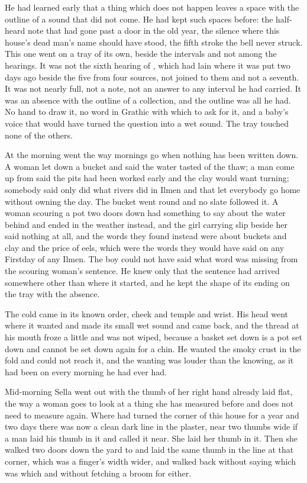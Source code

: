 He had learned early that a thing which does not happen leaves a space with the outline of a sound that did not come. He had kept such spaces before: the half-heard note that had gone past a door in the old year, the silence where this house's dead man's name should have stood, the fifth stroke the bell never struck. This one went on a tray of its own, beside the intervals and not among the hearings. It was not the sixth hearing of , which had lain where it was put two days ago beside the five from four sources, not joined to them and not a seventh. It was not nearly full, not a note, not an answer to any interval he had carried. It was an absence with the outline of a collection, and the outline was all he had. No hand to draw it, no word in Grathic with which to ask for it, and a baby's voice that would have turned the question into a wet sound. The tray touched none of the others.

At  the morning went the way mornings go when nothing has been written down. A woman let down a bucket and said the water tasted of the thaw; a man come up from  said the pits had been worked early and the clay would want turning; somebody said  only did what rivers did in Ilmen and that let everybody go home without owning the day. The bucket went round and no slate followed it. A woman scouring a pot two doors down had something to say about the water behind  and ended in the weather instead, and the girl carrying slip beside her said nothing at all, and the words they found instead were about buckets and clay and the price of eels, which were the words they would have said on any Firstday of any Ilmen. The boy could not have said what word was missing from the scouring woman's sentence. He knew only that the sentence had arrived somewhere other than where it started, and he kept the shape of its ending on the tray with the absence.

The cold came in its known order, cheek and temple and wrist. His head went where it wanted and made its small wet sound and came back, and the thread at his mouth froze a little and was not wiped, because a basket set down is a pot set down and cannot be set down again for a chin. He wanted the smoky crust in the fold and could not reach it, and the wanting was louder than the knowing, as it had been on every morning he had ever had.

Mid-morning Sella went out with the thumb of her right hand already laid flat, the way a woman goes to look at a thing she has measured before and does not need to measure again. Where  had turned the corner of this house for a year and two days there was now a clean dark line in the plaster, near two thumbs wide if a man laid his thumb in it and called it near. She laid her thumb in it. Then she walked two doors down the yard to  and laid the same thumb in the line at that corner, which was a finger's width wider, and walked back without saying which was which and without fetching a broom for either.

